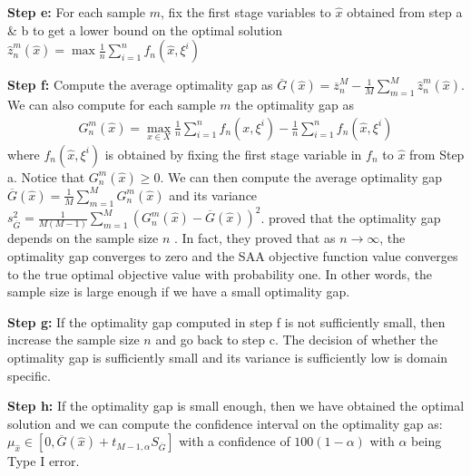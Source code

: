 \documentclass[forests,article,submit,moreauthors,pdftex]{Definitions/mdpi}
\begin{document}
\textbf{Step e:} For each sample $m$, fix the first stage variables to $\hat{x}$ obtained from  step a \& b to get a lower bound on the optimal solution $\hat{z}_n^{m}(\hat{x})= \max \frac{1}{n} \sum_{i=1}^{n} f_n\left(\hat{x}, \xi^{i}\right)$
 
 \textbf{Step f:} Compute the average optimality gap as $\overline{G}(\hat{x}) = \overline{z}_n^M - \frac{1}{M}\sum_{m=1}^{M}\hat{z}_n^m(\hat{x})$. We can also compute for each sample $m$ the optimality gap as 
 \begin{align}
    G_{n}^{m}(\hat{x}) = \max _{x \in X} \frac{1}{n} \sum_{i=1}^{n} f_n\left(x, \xi^{i}\right) - \frac{1}{n} \sum_{i=1}^{n} f_n\left(\hat{x}, \xi^{i}\right) \label{eq:gap}
\end{align}
where $f_n\left(\hat{x}, \xi^{i}\right)$ is obtained by fixing the first stage variable in $f_n$ to $\hat{x}$ from Step a. 
Notice that $ G_{n}^{m}(\hat{x}) \ge 0$.
We can then compute the average optimality gap $\overline{G}(\hat{x}) = \frac{1}{M}\sum_{m=1}^{M}G_n^m(\hat{x})$ and its variance $s_{\overline{G}}^{2} = \frac{1}{M(M-1)} \sum_{m=1}^{M}\left(G_{n}^{m}(\hat{x})-\overline{G}(\hat{x})\right)^{2}$.
\cite{Mak1999} proved that the optimality gap depends on the sample size $n$ . In fact, they proved that as $n \rightarrow \infty$, the optimality gap converges to zero and the SAA objective function value  converges to the true optimal objective value with probability one. In other words, the sample size is large enough if we have a small optimality gap.

 \textbf{Step g:} If the optimality gap computed in step f is not sufficiently small, then increase the sample size $n$ and go back to step c. The decision of whether the optimality gap is sufficiently small and its variance is sufficiently low is domain specific. 
 
 \textbf{Step h:} If the optimality gap is small enough,  then we have obtained the optimal solution and we can compute the confidence interval on the  optimality gap as:
 $\mu_{\hat{x}} \in \left[0, \overline{G}(\hat{x})+t_{M-1, \alpha} S_{\overline{G}}\right]$
with a confidence of $100(1-\alpha)$ with $\alpha$ being Type I error. 
 
 
\end{document}
